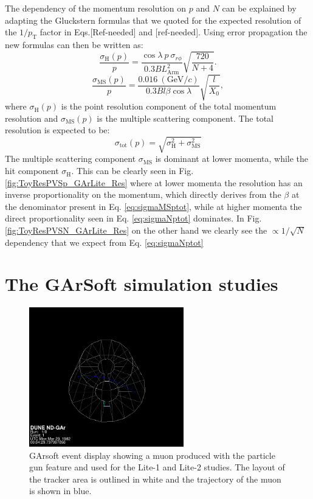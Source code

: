 The dependency of the momentum resolution on $p$ and $N$ can be explained by  adapting the Gluckstern formulas that we quoted for the expected resolution of the $1/p_{\text{T}}$ factor in Eqs.[Ref-needed] and [ref-needed]. Using error propagation the new formulas can then be written as:
\begin{equation}\label{eq:sigmaNptot}
\frac{\sigma_{\text{H}}(p)}{p}=\frac{\cos\lambda \ p  \ \sigma_{r\phi}}{0.3 BL_\textrm{Arm}^2}\sqrt{\frac{720}{N+4}}.
\end{equation}
\begin{equation}\label{eq:sigmaMSptot}
\frac{\sigma_{\text{MS}}(p)}{p}=\frac{0.016 \ (\textrm{GeV}/c)}{0.3 B l\beta \cos \lambda}\sqrt{\frac{l}{X_0}},
\end{equation}
where $\sigma_{\text{H}}(p)$ is the point resolution component of the total momentum resolution and $\sigma_{\text{MS}}(p)$ is the multiple scattering component. The total resolution is expected to be:
\begin{equation}
    \sigma_\text{tot}(p)=\sqrt{\sigma_\text{H}^2+\sigma_\text{MS}^2}
\end{equation}
The multiple scattering component $\sigma_\text{MS}$ is dominant at lower momenta, while the hit component $\sigma_\text{H}$. This can be clearly seen in Fig. \ref{fig:ToyResPVSp_GArLite_Res} where at lower momenta the resolution has an inverse proportionality on the momentum, which directly derives from the $\beta$ at the denominator present in Eq. \ref{eq:sigmaMSptot}, while at higher momenta the direct proportionality seen in Eq. \ref{eq:sigmaNptot} dominates. In Fig. \ref{fig:ToyResPVSN_GArLite_Res} on the other hand we clearly see the $\propto 1/\sqrt{N}$ dependency that we expect from Eq. \ref{eq:sigmaNptot}

\section{The GArSoft simulation studies}
\label{Sec:MC-Studies-Lite}

\begin{figure}[t]
     \centering
     \includegraphics[width=0.6\textwidth]{figures/ch4-KF_NDGArLite/MC/EvtDisplay.png}
     \caption{GArsoft event display showing a muon produced with the particle gun feature and used for the Lite-1 and Lite-2 studies. The layout of the tracker area is outlined in white and the trajectory of the muon is shown in blue. }
        \label{fig:GArLiteMuonEvent}
\end{figure} 

